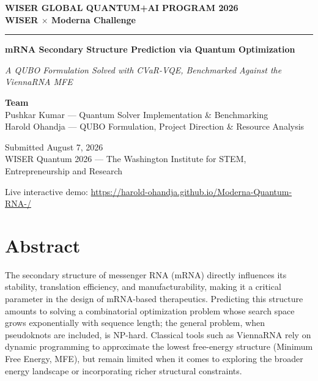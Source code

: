 \documentclass[11pt,a4paper]{article}
\begin{document}
	
	\begin{titlepage}
		\centering
		\vspace*{2.5cm}
		
		{\bfseries\color{graytext} WISER GLOBAL QUANTUM+AI PROGRAM 2026}\\[0.2cm]
		{\bfseries\color{graytext} WISER $\times$ Moderna Challenge}
		
		\vspace{0.4cm}
		\noindent\rule{\textwidth}{0.4pt}
		\vspace{2cm}
		
		{\Huge\bfseries mRNA Secondary Structure Prediction via Quantum Optimization\par}
		
		\vspace{0.8cm}
		{\Large\itshape\color{graytext} A QUBO Formulation Solved with CVaR-VQE, Benchmarked Against the ViennaRNA MFE\par}
		
		\vspace{2.5cm}
		
		{\large\bfseries Team}\\[0.3cm]
		{\large Pushkar Kumar --- Quantum Solver Implementation \& Benchmarking}\\[0.15cm]
		{\large Harold Ohandja --- QUBO Formulation, Project Direction \& Resource Analysis}
		
		\vspace{2.5cm}
		
		{\large Submitted August 7, 2026}\\[0.15cm]
		{\color{graytext} WISER Quantum 2026 --- The Washington Institute for STEM, Entrepreneurship and Research}
		
		\vfill
		
		{\color{graytext}\small Live interactive demo: \url{https://harold-ohandja.github.io/Moderna-Quantum-RNA-/}}
	\end{titlepage}
	
	\section*{Abstract}
	
	The secondary structure of messenger RNA (mRNA) directly influences its stability, translation efficiency, and manufacturability, making it a critical parameter in the design of mRNA-based therapeutics. Predicting this structure amounts to solving a combinatorial optimization problem whose search space grows exponentially with sequence length; the general problem, when pseudoknots are included, is NP-hard. Classical tools such as ViennaRNA rely on dynamic programming to approximate the lowest free-energy structure (Minimum Free Energy, MFE), but remain limited when it comes to exploring the broader energy landscape or incorporating richer structural constraints.
	
\end{document}
